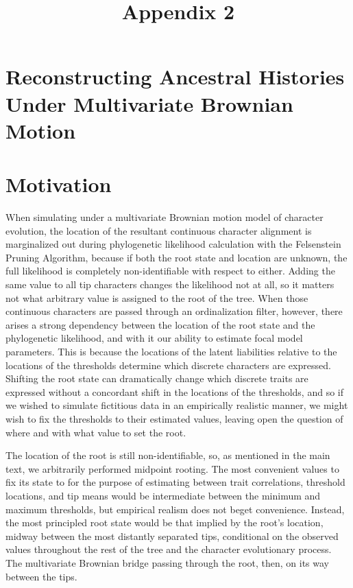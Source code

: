 \documentclass[10pt]{article}
\title{\vspace{-2.5cm}Appendix 2}
\author{}
\date{}
\begin{document}
\maketitle{}

\section*{Reconstructing Ancestral Histories Under Multivariate Brownian Motion}

\section{Motivation}

When simulating under a multivariate Brownian motion model of character evolution, the location of the resultant continuous character alignment is marginalized out during phylogenetic likelihood calculation with the Felsenstein Pruning Algorithm, because if both the root state and location are unknown, the full likelihood is completely non-identifiable with respect to either. Adding the same value to all tip characters changes the likelihood not at all, so it matters not what arbitrary value is assigned to the root of the tree. When those continuous characters are passed through an ordinalization filter, however, there arises a strong dependency between the location of the root state and the phylogenetic likelihood, and with it our ability to estimate focal model parameters. This is because the locations of the latent liabilities relative to the locations of the thresholds determine which discrete characters are expressed. Shifting the root state can dramatically change which discrete traits are expressed without a concordant shift in the locations of the thresholds, and so if we wished to simulate fictitious data in an empirically realistic manner, we might wish to fix the thresholds to their estimated values, leaving open the question of where and with what value to set the root.

The location of the root is still non-identifiable, so, as mentioned in the main text, we arbitrarily performed midpoint rooting. The most convenient values to fix its state to for the purpose of estimating between trait correlations, threshold locations, and tip means would be intermediate between the minimum and maximum thresholds, but empirical realism does not beget convenience. Instead, the most principled root state would be that implied by the root's location, midway between the most distantly separated tips, conditional on the observed values throughout the rest of the tree and the character evolutionary process. The multivariate Brownian bridge passing through the root, then, on its way between the tips.
\end{document}
